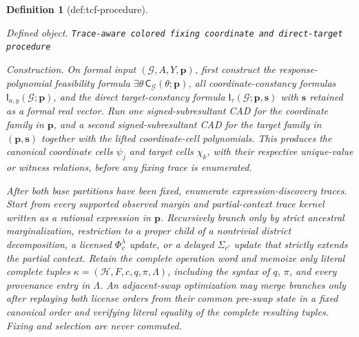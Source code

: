 \documentclass{article}
\newtheorem{definition}{Definition}
\begin{document}
\begin{definition}[def:tcf-procedure]\label{def:tcf-procedure}
\par\smallskip\noindent\emph{Defined object.} \texttt{Trace-\allowbreak{}aware colored fixing coordinate and direct-\allowbreak{}target procedure}
\par\smallskip\noindent\emph{Construction.} On formal input \((\mathcal G,A,Y,\mathbf p)\), first construct the response-polynomial feasibility formula \(\exists\theta\,\mathsf C_{\mathcal G}(\theta;\mathbf p)\), all coordinate-constancy formulas \(\mathsf I_{a,y}(\mathcal G;\mathbf p)\), and the direct target-constancy formula \(\mathsf I_{\tau}(\mathcal G;\mathbf p,\mathbf s)\) with \(\mathbf s\) retained as a formal real vector. Run one signed-subresultant CAD for the coordinate family in \(\mathbf p\), and a second signed-subresultant CAD for the target family in \((\mathbf p,\mathbf s)\) together with the lifted coordinate-cell polynomials. This produces the canonical coordinate cells \(\psi_j\) and target cells \(\chi_k\), with their respective unique-value or witness relations, before any fixing trace is enumerated.

After both base partitions have been fixed, enumerate expression-discovery traces. Start from every supported observed margin and partial-context trace kernel written as a rational expression in \(\mathbf p\). Recursively branch only by strict ancestral marginalization, restriction to a proper child of a nontrivial district decomposition, a licensed \(\Phi_v^{\lambda}\) update, or a delayed \(\Sigma_{c'}\) update that strictly extends the partial context. Retain the complete operation word and memoize only literal complete tuples \(\kappa=(\mathcal H,F,c,q,\pi,\Lambda)\), including the syntax of \(q\), \(\pi\), and every provenance entry in \(\Lambda\). An adjacent-swap optimization may merge branches only after replaying both license orders from their common pre-swap state in a fixed canonical order and verifying literal equality of the complete resulting tuples. Fixing and selection are never commuted.


\end{definition}
\end{document}
